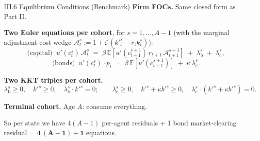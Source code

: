 \documentclass[aspectratio=169,11pt]{beamer}
\newcommand{\E}[1]{\mathbb{E}\!\left[#1\right]}
\begin{document}
\begin{frame}{III.6 Equilibrium Conditions (Benchmark)}
\small
\textbf{Firm FOCs.}  Same closed form as Part II.

\vspace{0.3em}
\textbf{Two Euler equations per cohort}, for $s = 1, \ldots, A-1$ (with the marginal adjustment-cost wedge $\mathcal{A}_t^s := 1 + \zeta\,(k'^s_t - r_t k_t^s)$):
\[
\text{(capital)}\;\;
u'(c_t^s)\,\mathcal{A}_t^s \;=\; \beta\,\E{u'(c_{t+1}^{s+1})\,r_{t+1}\,\mathcal{A}_{t+1}^{s+1}} \;+\; \lambda_{\text{b}}^s \;+\; \lambda_{\text{c}}^s,
\]
\[
\text{(bonds)}\;\;
u'(c_t^s)\cdot p_t \;=\; \beta\,\E{u'(c_{t+1}^{s+1})} \;+\; \kappa\,\lambda_{\text{c}}^s.
\]

\vspace{0.3em}
\textbf{Two KKT triples per cohort.}
\[
\lambda_{\text{b}}^s \ge 0,\quad k'^s \ge 0,\quad \lambda_{\text{b}}^s\cdot k'^s = 0;
\qquad
\lambda_{\text{c}}^s \ge 0,\quad k'^s + \kappa b'^s \ge 0,\quad \lambda_{\text{c}}^s\cdot (k'^s + \kappa b'^s) = 0.
\]

\vspace{0.3em}
\textbf{Terminal cohort.}  Age $A$: consume everything.

\vspace{0.4em}
{\footnotesize So per state we have $4(A-1)$ per-agent residuals + 1 bond market-clearing residual = $\bm{4\,(A-1) + 1}$ equations.}
\end{frame}
\end{document}
